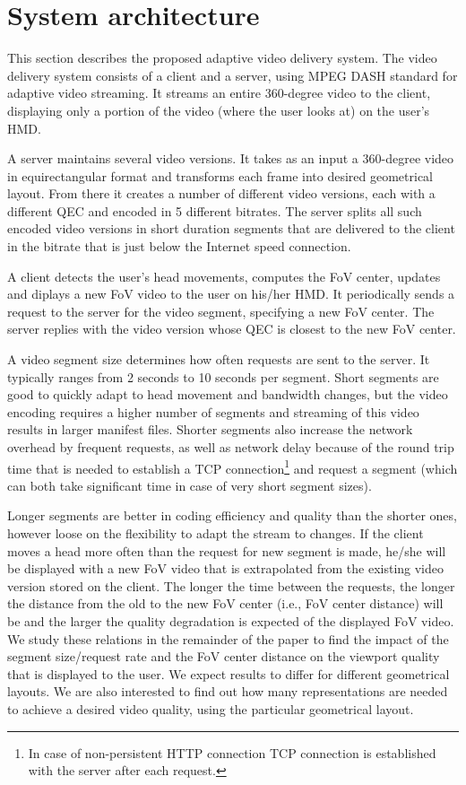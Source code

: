 \section{System architecture}

This section describes the proposed adaptive video delivery system. The video delivery system consists of a client and a server, using MPEG DASH standard \cite{} for adaptive video streaming. It streams an entire 360-degree video to the client, displaying only a portion of the video (where the user looks at) on the user's HMD.

A server maintains several video versions. It takes as an input a 360-degree video in equirectangular format and transforms each frame into desired geometrical layout. From there it creates a number of different video versions, each with a different QEC and encoded in 5 different bitrates.
 The server splits all such encoded video versions in short duration segments that are delivered to the client in the bitrate that is just below the Internet speed connection.

A client detects the user's head movements, computes the FoV center, updates and diplays a new FoV video to the user on his/her HMD. It periodically sends a request to the server for the video segment, specifying a new FoV center. The server replies with the video version whose QEC is closest to the new FoV center.

A video segment size determines how often requests are sent to the server. It typically ranges from 2 seconds to 10 seconds per segment. Short segments are good to quickly adapt to head movement and bandwidth changes, but the video encoding requires a higher number of segments and streaming of this video results in larger manifest files. Shorter segments also increase the network overhead by frequent requests, as well as network delay because of the round trip time that is needed to establish a TCP connection\footnote{In case of non-persistent HTTP connection TCP connection is established with the server after each request.} and request a segment (which can both take significant time in case of very short segment sizes).

Longer segments are better in coding efficiency and quality than the shorter ones, however loose on the flexibility to adapt the stream to changes. If the client moves a head more often than the request for new segment is made, he/she will be displayed with a new FoV video that is extrapolated from the existing video version stored on the client. The longer the time between the requests, the longer the distance from the old to the new FoV center (i.e., FoV center distance) will be and the larger the quality degradation is expected of the displayed FoV video. We study these relations in the remainder of the paper to find the impact of the segment size/request rate and the FoV center distance on the viewport quality that is displayed to the user. We expect results to differ for different geometrical layouts. We are also interested to find out how many representations are needed to achieve a desired video quality, using the particular geometrical layout.
